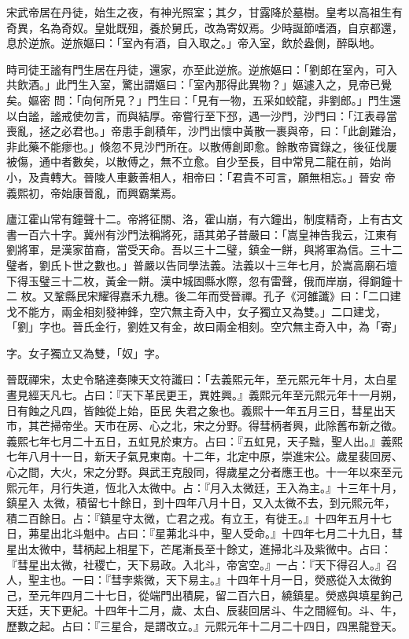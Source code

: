 \begin{pinyinscope}
 宋武帝居在丹徒，始生之夜，有神光照室；其夕，甘露降於墓樹。皇考以高祖生有奇異，名為奇奴。皇妣既殂，養於舅氏，改為寄奴焉。少時誕節嗜酒，自京都還，息於逆旅。逆旅嫗曰：「室內有酒，自入取之。」帝入室，飲於盎側，醉臥地。



 時司徒王謐有門生居在丹徒，還家，亦至此逆旅。逆旅嫗曰：「劉郎在室內，可入共飲酒。」此門生入室，驚出謂嫗曰：「室內那得此異物？」嫗遽入之，見帝已覺矣。嫗密
 問：「向何所見？」門生曰：「見有一物，五采如蛟龍，非劉郎。」門生還以白謐，謐戒使勿言，而與結厚。帝嘗行至下邳，遇一沙門，沙門曰：「江表尋當喪亂，拯之必君也。」帝患手創積年，沙門出懷中黃散一裹與帝，曰：「此創難治，非此藥不能瘳也。」倏忽不見沙門所在。以散傅創即愈。餘散帝寶錄之，後征伐屢被傷，通中者數矣，以散傅之，無不立愈。自少至長，目中常見二龍在前，始尚小，及貴轉大。晉陵人車藪善相人，相帝曰：「君貴不可言，願無相忘。」晉安
 帝義熙初，帝始康晉亂，而興霸業焉。



 廬江霍山常有鐘聲十二。帝將征關、洛，霍山崩，有六鐘出，制度精奇，上有古文書一百六十字。冀州有沙門法稱將死，語其弟子普嚴曰：「嵩皇神告我云，江東有劉將軍，是漢家苗裔，當受天命。吾以三十二璧，鎮金一餅，與將軍為信。三十二璧者，劉氏卜世之數也。」普嚴以告同學法義。法義以十三年七月，於嵩高廟石壇下得玉璧三十二枚，黃金一餅。漢中城固縣水際，忽有雷聲，俄而岸崩，得銅鐘十二
 枚。又鞏縣民宋耀得嘉禾九穗。後二年而受晉禪。孔子《河雒讖》曰：「二口建戈不能方，兩金相刻發神鋒，空穴無主奇入中，女子獨立又為雙。」二口建戈，「劉」字也。晉氏金行，劉姓又有金，故曰兩金相刻。空穴無主奇入中，為「寄」



 字。女子獨立又為雙，「奴」字。



 晉既禪宋，太史令駱達奏陳天文符讖曰：「去義熙元年，至元熙元年十月，太白星晝見經天凡七。占曰：『天下革民更王，異姓興。』義熙元年至元熙元年十一月朔，日有蝕之凡四，皆蝕從上始，臣民
 失君之象也。義熙十一年五月三日，彗星出天市，其芒掃帝坐。天市在房、心之北，宋之分野。得彗柄者興，此除舊布新之徵。義熙七年七月二十五日，五虹見於東方。占曰：『五虹見，天子黜，聖人出。』義熙七年八月十一日，新天子氣見東南。十二年，北定中原，崇進宋公。歲星裴回房、心之間，大火，宋之分野。與武王克殷同，得歲星之分者應王也。十一年以來至元熙元年，月行失道，恆北入太微中。占：『月入太微廷，王入為主。』十三年十月，鎮星入
 太微，積留七十餘日，到十四年八月十日，又入太微不去，到元熙元年，積二百餘日。占：『鎮星守太微，亡君之戎。有立王，有徙王。』十四年五月十七日，茀星出北斗魁中。占曰：『星茀北斗中，聖人受命。』十四年七月二十九日，彗星出太微中，彗柄起上相星下，芒尾漸長至十餘丈，進掃北斗及紫微中。占曰：『彗星出太微，社稷亡，天下易政。入北斗，帝宮空。』一占：『天下得召人。』召人，聖主也。一曰：『彗孛紫微，天下易主。』十四年十月一日，熒惑從入太微鉤
 己，至元年四月二十七日，從端門出積屍，留二百六日，繞鎮星。熒惑與填星鉤己天廷，天下更紀。十四年十二月，歲、太白、辰裴回居斗、牛之間經旬。斗、牛，歷數之起。占曰：『三星合，是謂改立。』元熙元年十二月二十四日，四黑龍登天。




\end{pinyinscope}
